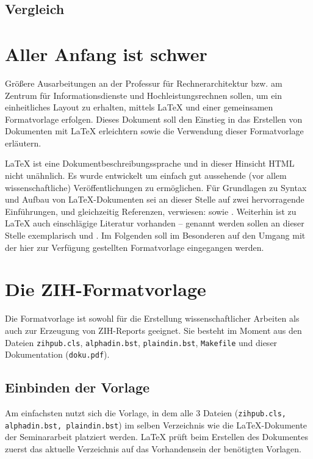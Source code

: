 \documentclass[plainarticle,zihtitle,german,final,hyperref,utf8]{zihpub}
\begin{document}
\subsection{Vergleich}




\section{Aller Anfang ist schwer}
Gr\"o{\ss}ere Ausarbeitungen an der Professur f\"ur Rechnerarchitektur bzw. am Zentrum f\"ur Informationsdienste und Hochleistungsrechnen sollen, um ein einheitliches Layout zu erhalten, mittels {\LaTeX} und einer gemeinsamen Formatvorlage erfolgen. 
Dieses Dokument soll den Einstieg in das Erstellen von Dokumenten mit {\LaTeX} erleichtern sowie die Verwendung dieser Formatvorlage erl\"autern.

{\LaTeX} ist eine Dokumentbeschreibungssprache und in dieser Hinsicht HTML nicht un\"ahnlich. 
Es wurde entwickelt um einfach gut aussehende (vor allem wissenschaftliche) Ver\"offentlichungen zu erm\"oglichen. 
F\"ur Grundlagen zu Syntax und Aufbau von {\LaTeX}-Dokumenten sei an dieser Stelle auf zwei hervorragende Einf\"uhrungen, und gleichzeitig Referenzen, verwiesen: \cite{kochbuch} sowie \cite{rudl}. 
Weiterhin ist zu {\LaTeX} auch einschl\"agige Literatur vorhanden -- genannt werden sollen an dieser Stelle exemplarisch \cite{begleiter} und \cite{kopka}. 
Im Folgenden soll im Besonderen auf den Umgang mit der hier zur Verf\"ugung gestellten Formatvorlage eingegangen werden.

\section{Die ZIH-Formatvorlage}
Die Formatvorlage ist sowohl f\"ur die Erstellung wissenschaftlicher Arbeiten als auch zur Erzeugung von ZIH-Reports geeignet. 
Sie besteht im Moment aus den Dateien \texttt{zihpub.cls}, \texttt{alphadin.bst}, \texttt{plaindin.bst}, \texttt{Makefile} und dieser Dokumentation (\texttt{doku.pdf}).


\subsection{Einbinden der Vorlage}
Am einfachsten nutzt sich die Vorlage, in dem alle 3 Dateien (\texttt{zihpub.cls, alphadin.bst, plaindin.bst}) im selben Verzeichnis wie die {\LaTeX}-Dokumente der Seminararbeit platziert werden. 
{\LaTeX} pr\"uft beim Erstellen des Dokumentes zuerst das aktuelle Verzeichnis auf das Vorhandensein der ben\"otigten Vorlagen.
\end{document}
